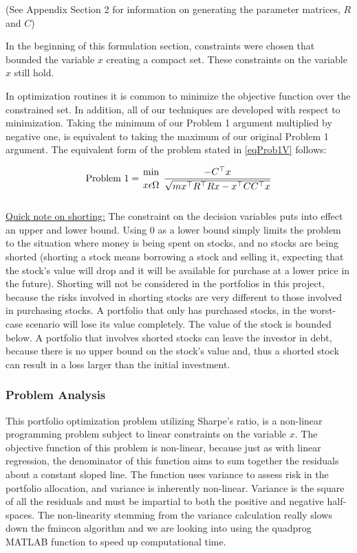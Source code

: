 \noindent (See Appendix Section 2 for information on generating the parameter matrices, $R$ and $C$)

In the beginning of this formulation section, constraints were chosen that bounded the variable $x$ creating a compact set.  These constraints on the variable $x$ still hold.

In optimization routines it is common to minimize the objective function over the constrained set.  In addition, all of our techniques are developed with respect to minimization.  Taking the minimum of our Problem 1 argument multiplied by negative one, is equivalent to taking the maximum of our original Problem 1 argument.  The equivalent form of the problem stated in \ref{eqProb1V} follows:

\begin{equation}\label{eqP1}
\text{Problem 1} = {{\mbox{min}}\atop{x\epsilon\Omega}} ~ \dfrac{-{C}^\top{x}}{\sqrt{m {x}^\top{R}^\top{R}{x} - {x}^\top{C}{C}^\top{x}}}
\end{equation} \\[-0.6cm]

\underline{Quick note on shorting:}  The constraint on the decision variables puts into effect an upper and lower bound. Using 0 as a lower bound simply limits the problem to the situation where money is being spent on stocks, and no stocks are being shorted (shorting a stock means borrowing a stock and selling it, expecting that the stock's value will drop and it will be available for purchase at a lower price in the future). Shorting will not be considered in the portfolios in this project, because the risks involved in shorting stocks are very different to those involved in purchasing stocks. A portfolio that only has purchased stocks, in the worst-case scenario will lose its value completely. The value of the stock is bounded below. A portfolio that involves shorted stocks can leave the investor in debt, because there is no upper bound on the stock's value and, thus a shorted stock can result in a loss larger than the initial investment.\cite{back1}


\subsubsection{Problem Analysis}

This portfolio optimization problem utilizing Sharpe's ratio, is a non-linear programming problem subject to linear constraints on the variable $x$.  The objective function of this problem is non-linear, because just as with linear regression, the denominator of this function aims to sum together the residuals about a constant sloped line.  The function uses variance to assess risk in the portfolio allocation, and variance is inherently non-linear.  Variance is the square of all the residuals and must be impartial to both the positive and negative half-spaces.  The non-linearity stemming from the variance calculation really slows down the fmincon algorithm and we are looking into using the quadprog MATLAB function to speed up computational time.  

